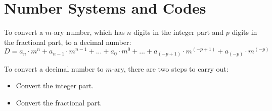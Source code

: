 \chapter{Number Systems and Codes}

    \par To convert a $m$-ary number, which has $n$ digits in the integer part and $p$ digits
    in the fractional part, to a decimal number:
    \begin{equation*}
      D = a_{n} \cdot m^{n} + a_{n - 1} \cdot m^{n - 1} + ... +
      a_{0} \cdot m^{0} + ... +
      a_{(-p + 1)} \cdot m^{(-p + 1)} + a_{(-p)} \cdot m^{(-p)}
    \end{equation*}
    \par To convert a decimal number to $m$-ary, there are two steps to carry out:
    \begin{itemize}
      \item Convert the integer part.
      \item Convert the fractional part.
    \end{itemize}
